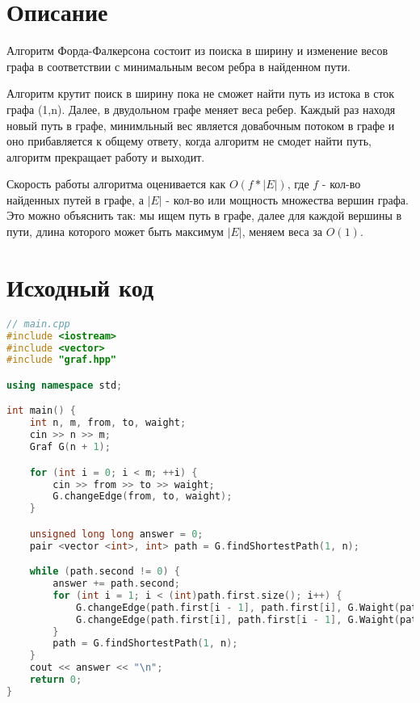 \section{Описание}

Алгоритм Форда-Фалкерсона состоит из поиска в ширину и изменение весов графа в соответствии с минимальным весом ребра в найденном пути.

Алгоритм крутит поиск в ширину пока не сможет найти путь из истока в сток графа (1,n). Далее, в двудольном графе меняет веса ребер. Каждый раз находя новый путь в графе, минимльный вес является довабочным потоком в графе и оно прибавляется к общему ответу, когда алгоритм не смодет найти путь, алгоритм прекращает работу и выходит.

Скорость работы алгоритма оценивается как $O(f * |E|)$, где $f$ - кол-во найденных путей в графе, а $|E|$ - кол-во или мощность множества вершин графа. Это можно объяснить так: мы ищем путь в графе, далее для каждой вершины в пути, длина которого может быть максимум $|E|$, меняем веса за $O(1)$.

\pagebreak

\section{Исходный код}

\begin{lstlisting}[language=C++]
// main.cpp
#include <iostream>
#include <vector>
#include "graf.hpp"

using namespace std;

int main() {
    int n, m, from, to, waight;
    cin >> n >> m;
    Graf G(n + 1);

    for (int i = 0; i < m; ++i) {
        cin >> from >> to >> waight;
        G.changeEdge(from, to, waight);
    }

    unsigned long long answer = 0;
    pair <vector <int>, int> path = G.findShortestPath(1, n);

    while (path.second != 0) {
        answer += path.second;
        for (int i = 1; i < (int)path.first.size(); i++) {
            G.changeEdge(path.first[i - 1], path.first[i], G.Waight(path.first[i - 1], path.first[i]) - path.second);
            G.changeEdge(path.first[i], path.first[i - 1], G.Waight(path.first[i], path.first[i - 1]) + path.second);
        }
        path = G.findShortestPath(1, n);
    }
    cout << answer << "\n";
    return 0;
}

\end{lstlisting}


